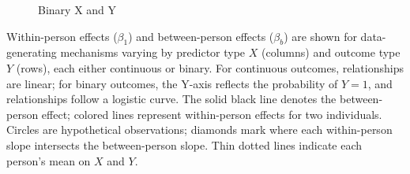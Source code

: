 \begin{center}
\begin{minipage}[t]{.45\linewidth}
\begin{subfigure}[b]{\linewidth}
        \caption{Binary X and Y}\label{fig:withinbetween-binxy}
        \end{subfigure}
    \end{minipage}
    
    \label{fig:path2}

    \vspace{-1cm}
    \begin{flushleft}
    \begin{figurenote}
    Within-person effects ($\beta_1$) and between-person effects ($\beta_b$) are shown for data-generating mechanisms varying by predictor type $X$ (columns) and outcome type $Y$ (rows), each either continuous or binary. For continuous outcomes, relationships are linear; for binary outcomes, the Y-axis reflects the probability of $Y = 1$, and relationships follow a logistic curve. The solid black line denotes the between-person effect; colored lines represent within-person effects for two individuals. Circles are hypothetical observations; diamonds mark where each within-person slope intersects the between-person slope. Thin dotted lines indicate each person's mean on $X$ and $Y$.
    
    \end{figurenote}
    \end{flushleft}
\end{center}

